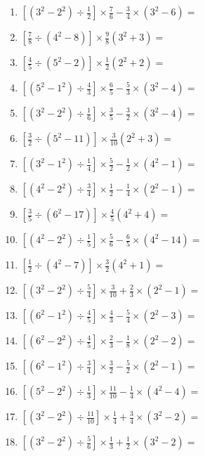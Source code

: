 \documentclass[12pt]{article}
\begin{document}
\begin{enumerate}[ itemsep=1.5cm]
	\item $\displaystyle \left[ \left( 3^2 - 2^2 \right) \div \frac{1}{2} \right] \times \frac{7}{6} - \frac{3}{4} \times \left( 3^2 - 6 \right) =$
	\item $\displaystyle \left[ \frac{7}{8} \div \left( 4^2 - 8 \right) \right] \times \frac{9}{8} \left( 3^2 + 3 \right) =$
	\item $\displaystyle \left[ \frac{4}{5} \div \left( 5^2 - 2 \right) \right] \times \frac{1}{2} \left( 2^2 + 2 \right) =$
	\item $\displaystyle \left[ \left( 5^2 - 1^2 \right) \div \frac{4}{3} \right] \times \frac{6}{5} - \frac{5}{3} \times \left( 3^2 - 4 \right) =$
	\item $\displaystyle \left[ \left( 3^2 - 2^2 \right) \div \frac{1}{6} \right] \times \frac{3}{5} - \frac{3}{2} \times \left( 3^2 - 4 \right) =$
	\item $\displaystyle \left[ \frac{3}{2} \div \left( 5^2 - 11 \right) \right] \times \frac{3}{10} \left( 2^2 + 3 \right) =$
	\item $\displaystyle \left[ \left( 3^2 - 1^2 \right) \div \frac{1}{4} \right] \times \frac{5}{2} - \frac{1}{2} \times \left( 4^2 - 1 \right) =$
	\item $\displaystyle \left[ \left( 4^2 - 2^2 \right) \div \frac{3}{4} \right] \times \frac{1}{2} - \frac{1}{4} \times \left( 2^2 - 1 \right) =$
	\item $\displaystyle \left[ \frac{3}{5} \div \left( 6^2 - 17 \right) \right] \times \frac{4}{5} \left( 4^2 + 4 \right) =$

	\item $\displaystyle \left[ \left( 4^2 - 2^2 \right) \div \frac{1}{5} \right] \times \frac{5}{6} - \frac{6}{5} \times \left( 4^2 - 14 \right) =$
	\item $\displaystyle \left[ \frac{1}{2} \div \left( 4^2 - 7 \right) \right] \times \frac{3}{2} \left( 4^2 + 1 \right) =$
	\item $\displaystyle \left[ \left( 3^2 - 2^2 \right) \div \frac{5}{4} \right] \times \frac{3}{10} + \frac{2}{3} \times \left( 2^2 - 1 \right) =$
	\item $\displaystyle \left[ \left( 6^2 - 1^2 \right) \div \frac{4}{5} \right] \times \frac{4}{3} - \frac{5}{4} \times \left( 2^2 - 3 \right) =$
	\item $\displaystyle \left[ \left( 6^2 - 2^2 \right) \div \frac{4}{5} \right] \times \frac{2}{3} - \frac{1}{8} \times \left( 2^2 - 2 \right) =$
	\item $\displaystyle \left[ \left( 6^2 - 1^2 \right) \div \frac{3}{4} \right] \times \frac{3}{2} - \frac{5}{2} \times \left( 2^2 - 1 \right) =$
	\item $\displaystyle \left[ \left( 5^2 - 2^2 \right) \div \frac{1}{3} \right] \times \frac{11}{10} - \frac{1}{4} \times \left( 4^2 - 4 \right) =$
	\item $\displaystyle \left[ \left( 3^2 - 2^2 \right) \div \frac{11}{10} \right] \times \frac{1}{4} + \frac{3}{4} \times \left( 3^2 - 2 \right) =$
	\item $\displaystyle \left[ \left( 3^2 - 2^2 \right) \div \frac{5}{6} \right] \times \frac{1}{3} + \frac{1}{2} \times \left( 3^2 - 2 \right) =$


\end{enumerate}
\end{document}
